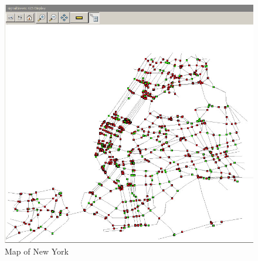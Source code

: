 \documentclass[11pt]{article}
\begin{document}
\begin{itemize}
\begin{itemize}
		\begin{figure}[h]
		\begin{center}
		\includegraphics[scale=0.3]{nyc_full}
		\caption{Map of New York}
		\end{center}
		\end{figure}
		
		
	\end{itemize}


\end{itemize}
\end{document}
